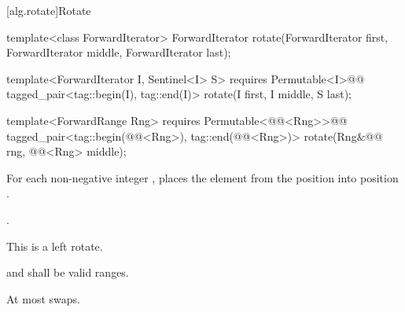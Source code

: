 [alg.rotate]{Rotate}

%
\begin{removedblock}
\begin{itemdecl}
template<class ForwardIterator>
  ForwardIterator rotate(ForwardIterator first, ForwardIterator middle,
              ForwardIterator last);
\end{itemdecl}
\end{removedblock}
\begin{addedblock}
\begin{itemdecl}
template<ForwardIterator I, Sentinel<I> S>
  requires Permutable<I>@\newtxt{()}@
  tagged_pair<tag::begin(I), tag::end(I)> rotate(I first, I middle, S last);

template<ForwardRange Rng>
  requires Permutable<@@<Rng>>@\newtxt{()}@
  tagged_pair<tag::begin(@@<Rng>), tag::end(@@<Rng>)>
    rotate(Rng&@\newtxt{\&}@ rng, @@<Rng> middle);
\end{itemdecl}
\end{addedblock}

\begin{itemdescr}
\pnum
\effects
For each non-negative integer
,
places the element from the position
into position
.

\pnum
\returns {}.

\pnum
\notes
This is a left rotate.

\pnum
\requires
{}
and
shall be valid ranges.

\pnum
\complexity
At most
swaps.
\end{itemdescr}

